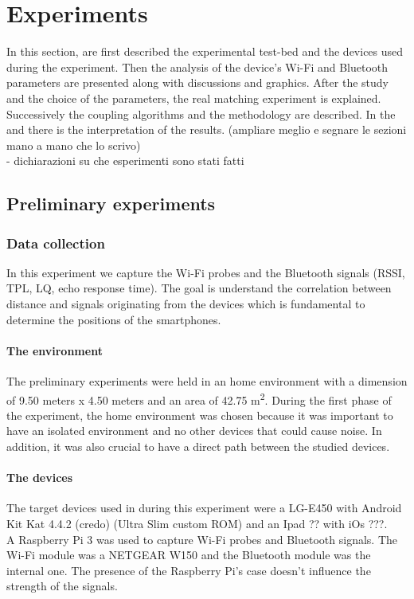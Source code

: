 \chapter{Experiments}
\label{capitolo5}
\thispagestyle{empty}

In this section, are first described the experimental test-bed and the devices used during the experiment. Then the analysis of the device's Wi-Fi and Bluetooth parameters are presented along with discussions and graphics. After the study and the choice of the parameters, the real matching experiment is explained. Successively the coupling algorithms and the methodology are described. In the and there is the interpretation of the results. (ampliare meglio e segnare le sezioni mano a mano che lo scrivo)\\

- dichiarazioni su che esperimenti sono stati fatti

\section{Preliminary experiments}
\subsection{Data collection}
In this experiment we capture the Wi-Fi probes and the Bluetooth signals (RSSI, TPL, LQ, echo response time).
The goal is understand the correlation between distance and signals originating from the devices which is fundamental to determine the positions of the smartphones.
\subsubsection{The environment}
The preliminary experiments were held in an home environment with a dimension of 9.50 meters x 4.50 meters and an area of 42.75 m\textsuperscript{2}.
During the first phase of the experiment, the home environment was chosen because it was important to have an isolated environment and no other devices that could cause noise. In addition, it was also crucial to have a direct path between the studied devices.\\
\subsubsection{The devices}
The target devices used in during this experiment were a LG-E450 with Android Kit Kat 4.4.2 (credo) (Ultra Slim custom ROM) and an Ipad ?? with iOs ???. \\
\linebreak
A Raspberry Pi 3 was used to capture Wi-Fi probes and Bluetooth signals. The Wi-Fi module was a NETGEAR W150 and the Bluetooth module was the internal one. The presence of the Raspberry Pi's case doesn't influence the strength of the signals.
